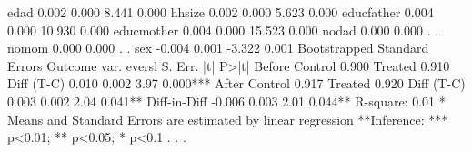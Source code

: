 edad                 {\VBAR} 0.002      {\VBAR} 0.000     {\VBAR} 8.441   {\VBAR} 0.000
hhsize               {\VBAR} 0.002      {\VBAR} 0.000     {\VBAR} 5.623   {\VBAR} 0.000
educfather           {\VBAR} 0.004      {\VBAR} 0.000     {\VBAR} 10.930  {\VBAR} 0.000
educmother           {\VBAR} 0.004      {\VBAR} 0.000     {\VBAR} 15.523  {\VBAR} 0.000
nodad                {\VBAR} 0.000      {\VBAR} 0.000     {\VBAR}     .   {\VBAR}     .
nomom                {\VBAR} 0.000      {\VBAR} 0.000     {\VBAR}     .   {\VBAR}     .
sex                  {\VBAR} -0.004     {\VBAR} 0.001     {\VBAR} -3.322  {\VBAR} 0.001
Bootstrapped Standard Errors
{\smallskip}
 Outcome var.   {\VBAR} evers{\tytilde}l {\VBAR} S. Err. {\VBAR}   |t|   {\VBAR}  P>|t|
Before          {\VBAR}         {\VBAR}         {\VBAR}         {\VBAR} 
   Control      {\VBAR} 0.900   {\VBAR}         {\VBAR}         {\VBAR} 
   Treated      {\VBAR} 0.910   {\VBAR}         {\VBAR}         {\VBAR} 
   Diff (T-C)   {\VBAR} 0.010   {\VBAR} 0.002   {\VBAR} 3.97    {\VBAR} 0.000***
After           {\VBAR}         {\VBAR}         {\VBAR}         {\VBAR} 
   Control      {\VBAR} 0.917   {\VBAR}         {\VBAR}         {\VBAR} 
   Treated      {\VBAR} 0.920   {\VBAR}         {\VBAR}         {\VBAR} 
   Diff (T-C)   {\VBAR} 0.003   {\VBAR} 0.002   {\VBAR} 2.04    {\VBAR} 0.041**
                {\VBAR}         {\VBAR}         {\VBAR}         {\VBAR} 
Diff-in-Diff    {\VBAR} -0.006  {\VBAR} 0.003   {\VBAR} 2.01    {\VBAR} 0.044**
R-square:    0.01
* Means and Standard Errors are estimated by linear regression
**Inference: *** p<0.01; ** p<0.05; * p<0.1
{\smallskip}
. 
. 
. 
